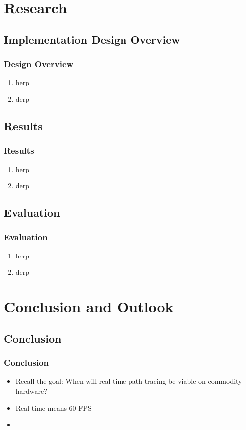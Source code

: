 \documentclass{beamer}
\begin{document}
\section{Research}
\subsection{Implementation Design Overview}
\begin{frame}
    \frametitle{Design Overview}
    \begin{enumerate}
        \item herp
        \item derp
    \end{enumerate}
\end{frame}

\subsection{Results}
\begin{frame}
    \frametitle{Results}
    \begin{enumerate}
        \item herp
        \item derp
    \end{enumerate}
\end{frame}

\subsection{Evaluation}
\begin{frame}
    \frametitle{Evaluation}
    \begin{enumerate}
        \item herp
        \item derp
    \end{enumerate}
\end{frame}

\section{Conclusion and Outlook}
\subsection{Conclusion}
\begin{frame}
    \frametitle{Conclusion}
    \begin{itemize}
        \item Recall the goal: When will real time path tracing be viable on commodity hardware?
        \item Real time means 60 FPS
        \pause
        \item 
    \end{itemize}
\end{frame}
\end{document}

